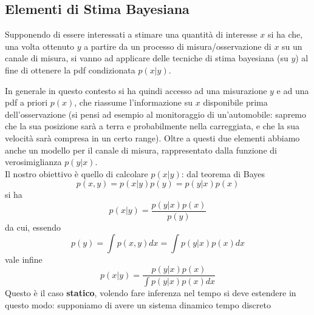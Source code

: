 \subsection{Elementi di Stima Bayesiana}
Supponendo di essere interessati a stimare una quantit\`a di interesse $x$ si ha che, una volta ottenuto $y$ a partire da un processo di misura/osservazione di $x$ su un canale di misura, si vanno ad applicare delle tecniche di stima bayesiana (su $y$) al fine di ottenere la pdf condizionata $p(x|y)$. 
\begin{center}
\end{center}
In generale in questo contesto si ha quindi accesso ad una misurazione $y$ e ad una pdf a priori $p(x)$, che riassume l'informazione su $x$ disponibile prima dell'osservazione (si pensi ad esempio al monitoraggio di un'automobile: sapremo che la sua posizione sar\`a a terra e probabilmente nella carreggiata, e che la sua velocit\`a sar\`a compresa in un certo range). Oltre a questi due elementi abbiamo anche un modello per il canale di misura, rappresentato dalla funzione di verosimiglianza $p(y|x)$. \\
Il nostro obiettivo \`e quello di calcolare $p(x|y)$: dal teorema di Bayes
\begin{equation}
p(x,y) = p(x|y)p(y) = p(y|x)p(x)
\end{equation} si ha
\begin{equation}
p(x|y) = \frac{p(y|x)p(x)}{p(y)}
\end{equation} da cui, essendo
\begin{equation}
p(y) = \int p(x,y) dx = \int p(y|x)p(x) dx
\end{equation} vale infine
\begin{equation}
p(x|y) = \frac{p(y|x)p(x)}{\int p(y|x)p(x)dx}
\end{equation}
Questo \`e il caso \textbf{statico}, volendo fare inferenza nel tempo si deve estendere in questo modo: supponiamo di avere un sistema dinamico tempo discreto
